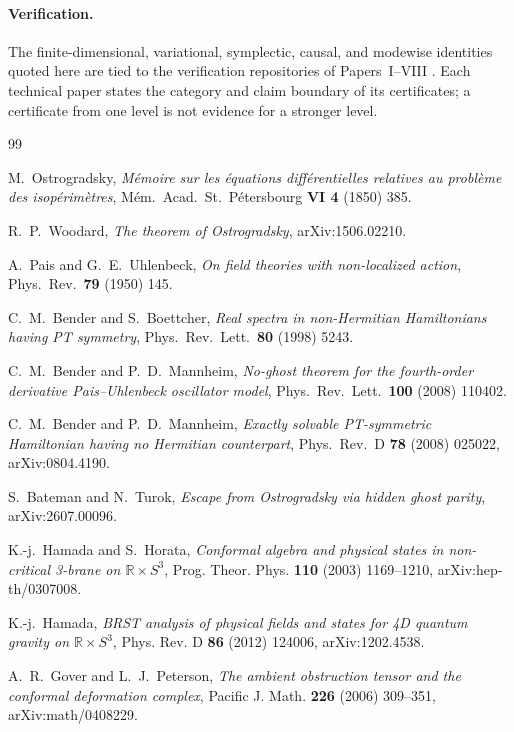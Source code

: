 \documentclass[11pt]{article}
\theoremstyle{remark}
\newcommand{\R}{\mathbb{R}}
\begin{document}
\paragraph{Verification.}
The finite-dimensional, variational, symplectic, causal, and modewise
identities quoted here are tied to the verification repositories of
Papers~I--VIII
\cite{paperI,paperII,paperIII,paperIV,paperV,paperVI,paperVII,paperVIII}.
Each technical paper states the category and claim boundary of its
certificates; a certificate from one level is not evidence for a stronger
level.
\begin{thebibliography}{99}
\raggedright

M.~Ostrogradsky,
\emph{M\'emoire sur les \'equations diff\'erentielles relatives au
probl\`eme des isop\'erim\`etres},
M\'em.\ Acad.\ St.\ P\'etersbourg \textbf{VI 4} (1850) 385.

R.~P.~Woodard,
\emph{The theorem of Ostrogradsky},
arXiv:1506.02210.

A.~Pais and G.~E.~Uhlenbeck,
\emph{On field theories with non-localized action},
Phys.\ Rev.\ \textbf{79} (1950) 145.

C.~M.~Bender and S.~Boettcher,
\emph{Real spectra in non-Hermitian Hamiltonians having PT symmetry},
Phys.\ Rev.\ Lett.\ \textbf{80} (1998) 5243.

C.~M.~Bender and P.~D.~Mannheim,
\emph{No-ghost theorem for the fourth-order derivative Pais--Uhlenbeck
oscillator model},
Phys.\ Rev.\ Lett.\ \textbf{100} (2008) 110402.

C.~M.~Bender and P.~D.~Mannheim,
\emph{Exactly solvable PT-symmetric Hamiltonian having no Hermitian
counterpart},
Phys.\ Rev.\ D \textbf{78} (2008) 025022, arXiv:0804.4190.

S.~Bateman and N.~Turok,
\emph{Escape from Ostrogradsky via hidden ghost parity},
arXiv:2607.00096.

K.-j.~Hamada and S.~Horata,
\emph{Conformal algebra and physical states in non-critical 3-brane on
$\R\times S^3$},
Prog. Theor. Phys. \textbf{110} (2003) 1169--1210,
arXiv:hep-th/0307008.

K.-j.~Hamada,
\emph{BRST analysis of physical fields and states for 4D quantum gravity on
$\R\times S^3$},
Phys. Rev. D \textbf{86} (2012) 124006,
arXiv:1202.4538.

A.~R.~Gover and L.~J.~Peterson,
\emph{The ambient obstruction tensor and the conformal deformation complex},
Pacific J. Math. \textbf{226} (2006) 309--351,
arXiv:math/0408229.


\end{thebibliography}
\end{document}
